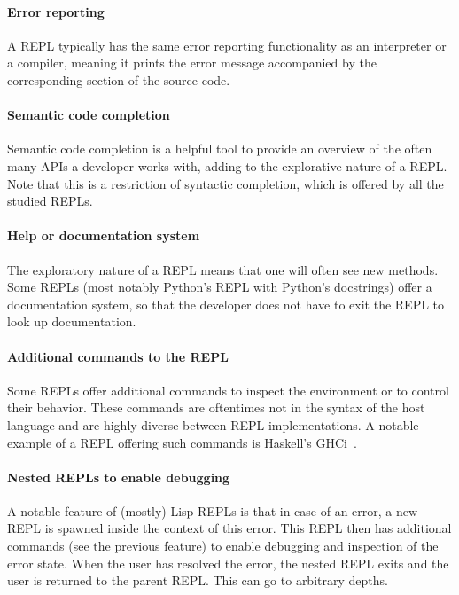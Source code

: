 \paragraph{Error reporting} A REPL typically has the same error reporting
functionality as an interpreter or a compiler, meaning it prints the error
message accompanied by the corresponding section of the source code.

\paragraph{Semantic code completion} Semantic code completion is a helpful tool
to provide an overview of the often many APIs a developer works with, adding to
the explorative nature of a REPL. Note that this is a restriction of syntactic
completion, which is offered by all the studied REPLs.

\paragraph{Help or documentation system} The exploratory nature of a REPL means
that one will often see new methods. Some REPLs (most notably Python's REPL with
Python's docstrings) offer a documentation system, so that the developer does
not have to exit the REPL to look up documentation.

\paragraph{Additional commands to the REPL} Some REPLs offer additional commands
to inspect the environment or to control their behavior. These commands are
oftentimes not in the syntax of the host language and are highly diverse between
REPL implementations. A notable example of a REPL offering such commands is
Haskell's GHCi~\cite{GHCi-commands}.

\paragraph{Nested REPLs to enable debugging} A notable feature of (mostly) Lisp
REPLs is that in case of an error, a new REPL is spawned inside the context of
this error. This REPL then has additional commands (see the previous feature) to
enable debugging and inspection of the error state. When the user has
resolved the error, the nested REPL exits and the user is returned to the
parent REPL. This can go to arbitrary depths.

